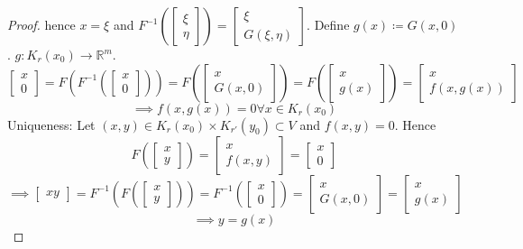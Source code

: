 \documentclass{article}
\begin{document}
\begin{proof}
  hence $x = \xi$ and $F^{-1}(\begin{bmatrix} \xi \\ \eta \end{bmatrix}) = \begin{bmatrix} \xi \\ G(\xi, \eta) \end{bmatrix}$.
  Define $g(x) \coloneqq G(x, 0)$. $g: K_r(x_0) \to \mathbb R^m$.
  \[ \begin{bmatrix} x \\ 0 \end{bmatrix} = F\left(F^{-1}\left(\begin{bmatrix} x \\ 0 \end{bmatrix}\right)\right) = F\left(\begin{bmatrix} x \\ G(x, 0) \end{bmatrix}\right) = F\left(\begin{bmatrix} x \\ g(x) \end{bmatrix}\right) = \begin{bmatrix} x \\ f(x, g(x)) \end{bmatrix} \]
  \[ \implies f(x, g(x)) = 0 \forall x \in K_r(x_0) \]
  Uniqueness: Let $(x, y) \in K_r(x_0) \times K_{r'}(y_0) \subset V$ and $f(x, y) = 0$.
  Hence
  \[ F(\begin{bmatrix} x \\ y \end{bmatrix}) = \begin{bmatrix} x \\ f(x, y) \end{bmatrix} = \begin{bmatrix} x \\ 0 \end{bmatrix} \]
  \[ \implies \begin{bmatrix} xy \end{bmatrix} = F^{-1}(F(\begin{bmatrix} x \\ y \end{bmatrix})) = F^{-1}(\begin{bmatrix} x \\ 0 \end{bmatrix}) = \begin{bmatrix} x \\ G(x,0) \end{bmatrix} = \begin{bmatrix} x \\ g(x) \end{bmatrix} \]
  \[ \implies y = g(x) \]
\end{proof}
\end{document}
